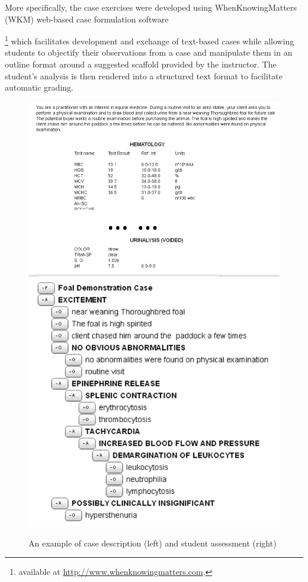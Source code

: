 More specifically, the case exercises were developed using
WhenKnowingMatters (WKM) web-based case formulation
software{\footnote{available at \url{http://www.whenknowingmatters.com}.}
which facilitates development and exchange of text-based cases while
allowing students to objectify their observations from a case and
manipulate them in an outline format around a suggested scaffold provided
by the instructor. The student's analysis is then rendered into a
structured text format to facilitate automatic grading.

\begin{figure}[ht]
\includegraphics[scale=0.5]{case-desc-small.png}
\includegraphics[scale=0.6]{student-work-small.png}
\caption{An example of case description (left) and student assessment (right)}
\label{fig:example}
\end{figure}

}
